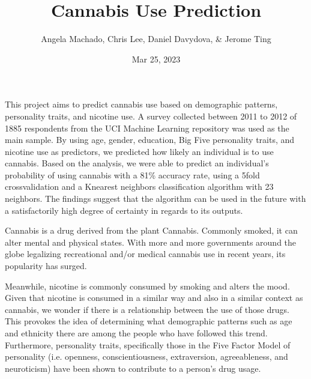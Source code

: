 \documentclass[letterpaper,10pt,english]{jupyterBook}
\title{Cannabis Use Prediction}
\date{Mar 25, 2023}
\author{Angela Machado, Chris Lee, Daniel Davydova, \& Jerome Ting}
\begin{document}
\pagestyle{empty}
\sphinxmaketitle
\pagestyle{plain}
\sphinxtableofcontents
\pagestyle{normal}
\label{\detokenize{Cannabis-Use-Prediction_Analysis::doc}}


\begin{DUlineblock}{0em}
\item[] 
\end{DUlineblock}

\sphinxAtStartPar
This project aims to predict cannabis use based on demographic patterns, personality traits, and nicotine use. A survey collected between 2011 to 2012 of 1885 respondents from the UCI Machine Learning repository was used as the main sample. By using age, gender, education, Big Five personality traits, and nicotine use as predictors, we predicted how likely an individual is to use cannabis. Based on the analysis, we were able to predict an individual’s probability of using cannabis with a 81\% accuracy rate, using a 5\sphinxhyphen{}fold cross\sphinxhyphen{}validation and a K\sphinxhyphen{}nearest neighbors classification algorithm with 23 neighbors. The findings suggest that the algorithm can be used in the future with a satisfactorily high degree of certainty in regards to its outputs.

\begin{DUlineblock}{0em}
\item[] 
\end{DUlineblock}

\sphinxAtStartPar
Cannabis is a drug derived from the plant Cannabis. Commonly smoked, it can alter mental and physical states. With more and more governments around the globe legalizing recreational and/or medical cannabis use in recent years, its popularity has surged. 

\sphinxAtStartPar
Meanwhile, nicotine is commonly consumed by smoking and alters the mood. Given that nicotine is consumed in a similar way and also in a similar context as cannabis, we wonder if there is a relationship between the use of those drugs. This provokes the idea of determining what demographic patterns such as age and ethnicity there are among the people who have followed this trend.  Furthermore, personality traits, specifically those in the Five Factor Model of personality (i.e. openness, conscientiousness, extraversion, agreeableness, and neuroticism) have been shown to contribute to a person’s drug usage. 
\end{document}
